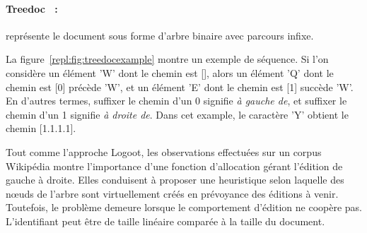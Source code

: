 \paragraph{Treedoc~\cite{letia2009crdts, preguica2009commutative} :}
représente le document sous forme d'arbre binaire avec parcours infixe.
  
\begin{figure*}
  \begin{center}
    
    \caption{\label{repl:fig:treedocexample}Example de sequence dont les
      chemins sont alloués grâce à Treedoc.}
  \end{center}
\end{figure*}

\noindent La figure~\ref{repl:fig:treedocexample} montre un exemple de séquence. Si l'on
considère un élément 'W' dont le chemin est [], alors un élément 'Q' dont le
chemin est [0] précède 'W', et un élément 'E' dont le chemin est [1] succède
'W'. En d'autres termes, suffixer le chemin d'un 0 signifie \emph{à gauche de},
et suffixer le chemin d'un 1 signifie \emph{à droite de}. Dans cet example, le
caractère 'Y' obtient le chemin [1.1.1.1].
  
\noindent Tout comme l'approche Logoot, les observations effectuées sur un
corpus Wikipédia montre l'importance d'une fonction d'allocation gérant
l'édition de gauche à droite. Elles conduisent à proposer une heuristique selon
laquelle des nœuds de l'arbre sont virtuellement créés en prévoyance des
éditions à venir. Toutefois, le problème demeure lorsque le comportement
d'édition ne coopère pas. L'identifiant peut être de taille linéaire comparée à
la taille du document.



